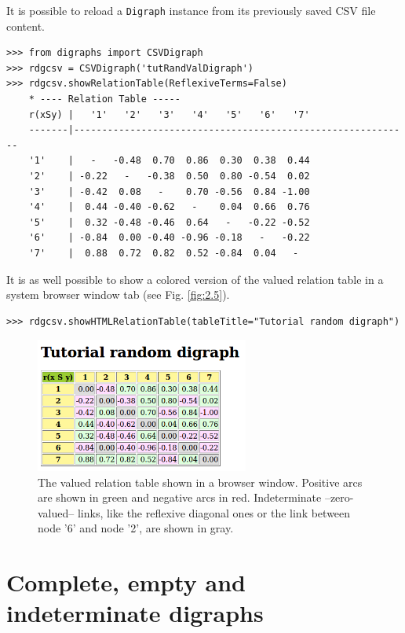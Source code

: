 It is possible to reload a \texttt{Digraph} instance from its previously saved CSV file content.
\begin{lstlisting} 
>>> from digraphs import CSVDigraph   
>>> rdgcsv = CSVDigraph('tutRandValDigraph')
>>> rdgcsv.showRelationTable(ReflexiveTerms=False)
    * ---- Relation Table -----
    r(xSy) |   '1'   '2'   '3'   '4'   '5'   '6'   '7'	  
    -------|------------------------------------------------------------
    '1'    |   -   -0.48  0.70  0.86  0.30  0.38  0.44	 
    '2'    | -0.22   -   -0.38  0.50  0.80 -0.54  0.02	 
    '3'    | -0.42  0.08   -    0.70 -0.56  0.84 -1.00	 
    '4'    |  0.44 -0.40 -0.62   -    0.04  0.66  0.76	 
    '5'    |  0.32 -0.48 -0.46  0.64   -   -0.22 -0.52	 
    '6'    | -0.84  0.00 -0.40 -0.96 -0.18   -   -0.22	 
    '7'    |  0.88  0.72  0.82  0.52 -0.84  0.04   -
\end{lstlisting}
  
It is as well possible to show a colored version of the valued relation table in a system browser window tab (see Fig. \ref{fig:2.5}).
\begin{lstlisting}
>>> rdgcsv.showHTMLRelationTable(tableTitle="Tutorial random digraph")
\end{lstlisting}
 \begin{figure}[h]
\sidecaption
\includegraphics[width=7cm]{Figures/htmlTutorialDigraph.png}
\caption{The valued relation table shown in a browser window. Positive arcs are shown in green and negative arcs in red. Indeterminate --zero-valued-- links, like the reflexive diagonal ones or the link between node '6' and node '2', are shown in gray.}
\label{fig:2.6}       %
\end{figure}
 
\section{Complete, empty and indeterminate digraphs}
\label{sec:2.10}

